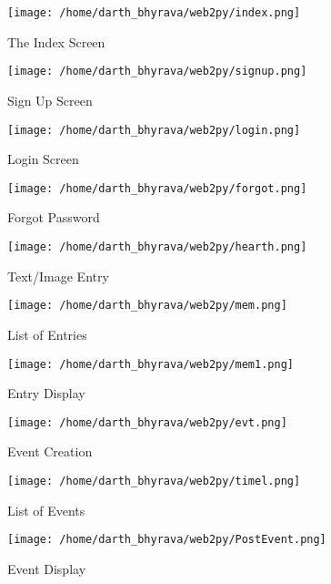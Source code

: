 \documentclass{article}
\begin{document}
\begin{figure}
  \texttt{[image: /home/darth\_bhyrava/web2py/index.png]}
  \caption{The Index Screen}
  \label{fig:s1}
\end{figure}

\begin{figure}
  \texttt{[image: /home/darth\_bhyrava/web2py/signup.png]}
  \caption{Sign Up Screen}
  \label{fig:s2}
\end{figure}

\begin{figure}
  \texttt{[image: /home/darth\_bhyrava/web2py/login.png]}
  \caption{Login Screen}
  \label{fig:s3}
\end{figure}

\begin{figure}
  \texttt{[image: /home/darth\_bhyrava/web2py/forgot.png]}
  \caption{Forgot Password}
  \label{fig:s4}
\end{figure}

\begin{figure}
  \texttt{[image: /home/darth\_bhyrava/web2py/hearth.png]}
  \caption{Text/Image Entry}
  \label{fig:s5}
\end{figure}

\begin{figure}
  \texttt{[image: /home/darth\_bhyrava/web2py/mem.png]}
  \caption{List of Entries}
  \label{fig:s6}
\end{figure}

\begin{figure}
  \texttt{[image: /home/darth\_bhyrava/web2py/mem1.png]}
  \caption{Entry Display}
  \label{fig:s7}
\end{figure}

\begin{figure}
  \texttt{[image: /home/darth\_bhyrava/web2py/evt.png]}
  \caption{Event Creation}
  \label{fig:s8}
\end{figure}

\begin{figure}
  \texttt{[image: /home/darth\_bhyrava/web2py/timel.png]}
  \caption{List of Events}
  \label{fig:s9}
\end{figure}

\begin{figure}
  \texttt{[image: /home/darth\_bhyrava/web2py/PostEvent.png]}
  \caption{Event Display}
  \label{fig:s10}
\end{figure}
\end{document}
